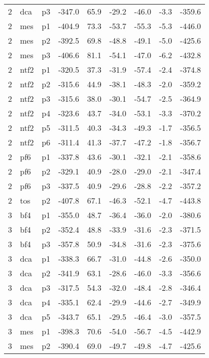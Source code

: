 \documentclass[a4paper]{article}
\begin{document}
\begin{table}[ht]
\begin{tabular}{rllrrrrrr}
   2 & dca & p3 & -347.0 & 65.9 & -29.2 & -46.0 & -3.3 & -359.6 \\ 
   2 & mes & p1 & -404.9 & 73.3 & -53.7 & -55.3 & -5.3 & -446.0 \\ 
   2 & mes & p2 & -392.5 & 69.8 & -48.8 & -49.1 & -5.0 & -425.6 \\ 
   2 & mes & p3 & -406.6 & 81.1 & -54.1 & -47.0 & -6.2 & -432.8 \\ 
   2 & ntf2 & p1 & -320.5 & 37.3 & -31.9 & -57.4 & -2.4 & -374.8 \\ 
   2 & ntf2 & p2 & -315.6 & 44.9 & -38.1 & -48.3 & -2.0 & -359.2 \\ 
   2 & ntf2 & p3 & -315.6 & 38.0 & -30.1 & -54.7 & -2.5 & -364.9 \\ 
   2 & ntf2 & p4 & -323.6 & 43.7 & -34.0 & -53.1 & -3.3 & -370.2 \\ 
   2 & ntf2 & p5 & -311.5 & 40.3 & -34.3 & -49.3 & -1.7 & -356.5 \\ 
   2 & ntf2 & p6 & -311.4 & 41.3 & -37.7 & -47.2 & -1.8 & -356.7 \\ 
   2 & pf6 & p1 & -337.8 & 43.6 & -30.1 & -32.1 & -2.1 & -358.6 \\ 
   2 & pf6 & p2 & -329.1 & 40.9 & -28.0 & -29.0 & -2.1 & -347.4 \\ 
   2 & pf6 & p3 & -337.5 & 40.9 & -29.6 & -28.8 & -2.2 & -357.2 \\ 
   2 & tos & p2 & -407.8 & 67.1 & -46.3 & -52.1 & -4.7 & -443.8 \\ 
   3 & bf4 & p1 & -355.0 & 48.7 & -36.4 & -36.0 & -2.0 & -380.6 \\ 
   3 & bf4 & p2 & -352.4 & 48.8 & -33.9 & -31.6 & -2.3 & -371.5 \\ 
   3 & bf4 & p3 & -357.8 & 50.9 & -34.8 & -31.6 & -2.3 & -375.6 \\ 
   3 & dca & p1 & -338.3 & 66.7 & -31.0 & -44.8 & -2.6 & -350.0 \\ 
   3 & dca & p2 & -341.9 & 63.1 & -28.6 & -46.0 & -3.3 & -356.6 \\ 
   3 & dca & p3 & -317.5 & 54.3 & -32.0 & -48.4 & -2.8 & -346.4 \\ 
   3 & dca & p4 & -335.1 & 62.4 & -29.9 & -44.6 & -2.7 & -349.9 \\ 
   3 & dca & p5 & -343.7 & 65.1 & -29.5 & -46.4 & -3.0 & -357.5 \\ 
   3 & mes & p1 & -398.3 & 70.6 & -54.0 & -56.7 & -4.5 & -442.9 \\ 
   3 & mes & p2 & -390.4 & 69.0 & -49.7 & -49.8 & -4.7 & -425.6 \\ 

\end{tabular}
\end{table}
\end{document}
